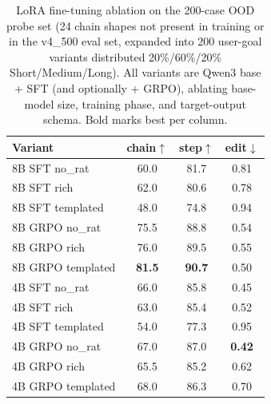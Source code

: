 \begin{table}[!ht]
\centering
\caption{LoRA fine-tuning ablation on the 200-case OOD probe set (24 chain shapes not present in training or in the v4\_500 eval set, expanded into 200 user-goal variants distributed 20\%/60\%/20\% Short/Medium/Long). All variants are Qwen3 base + SFT (and optionally + GRPO), ablating base-model size, training phase, and target-output schema. Bold marks best per column.}
\label{tab:director_routing_lora_ablation_probe200}
\small
\setlength{\tabcolsep}{8pt}
\begin{tabular}{l|ccc}
\toprule
Variant & chain$\uparrow$ & step$\uparrow$ & edit$\downarrow$ \\
\midrule
8B SFT no\_rat & 60.0 & 81.7 & 0.81 \\
8B SFT rich & 62.0 & 80.6 & 0.78 \\
8B SFT templated & 48.0 & 74.8 & 0.94 \\
8B GRPO no\_rat & 75.5 & 88.8 & 0.54 \\
8B GRPO rich & 76.0 & 89.5 & 0.55 \\
8B GRPO templated & \textbf{81.5} & \textbf{90.7} & 0.50 \\
\midrule
4B SFT no\_rat & 66.0 & 85.8 & 0.45 \\
4B SFT rich & 63.0 & 85.4 & 0.52 \\
4B SFT templated & 54.0 & 77.3 & 0.95 \\
4B GRPO no\_rat & 67.0 & 87.0 & \textbf{0.42} \\
4B GRPO rich & 65.5 & 85.2 & 0.62 \\
4B GRPO templated & 68.0 & 86.3 & 0.70 \\
\bottomrule
\end{tabular}
\end{table}
